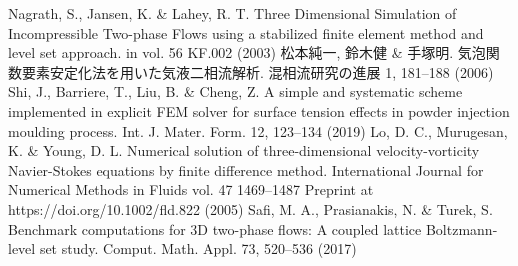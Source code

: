 \documentclass[8pt,a4paper]{article}
\begin{document}
\begin{thebibliography}{99}
	 Nagrath, S., Jansen, K. \& Lahey, R. T. Three Dimensional Simulation of Incompressible Two-phase Flows using a stabilized finite element method and level set approach. in vol. 56 KF.002 (2003)
	 松本純一, 鈴木健 \& 手塚明. 気泡関数要素安定化法を用いた気液二相流解析. 混相流研究の進展 1, 181–188 (2006)
	 Shi, J., Barriere, T., Liu, B. \& Cheng, Z. A simple and systematic scheme implemented in explicit FEM solver for surface tension effects in powder injection moulding process. Int. J. Mater. Form. 12, 123–134 (2019)
	 Lo, D. C., Murugesan, K. \& Young, D. L. Numerical solution of three-dimensional velocity-vorticity Navier-Stokes equations by finite difference method. International Journal for Numerical Methods in Fluids vol. 47 1469–1487 Preprint at https://doi.org/10.1002/fld.822 (2005)
	 Safi, M. A., Prasianakis, N. \& Turek, S. Benchmark computations for 3D two-phase flows: A coupled lattice Boltzmann-level set study. Comput. Math. Appl. 73, 520–536 (2017)
\end{thebibliography}
\end{document}

